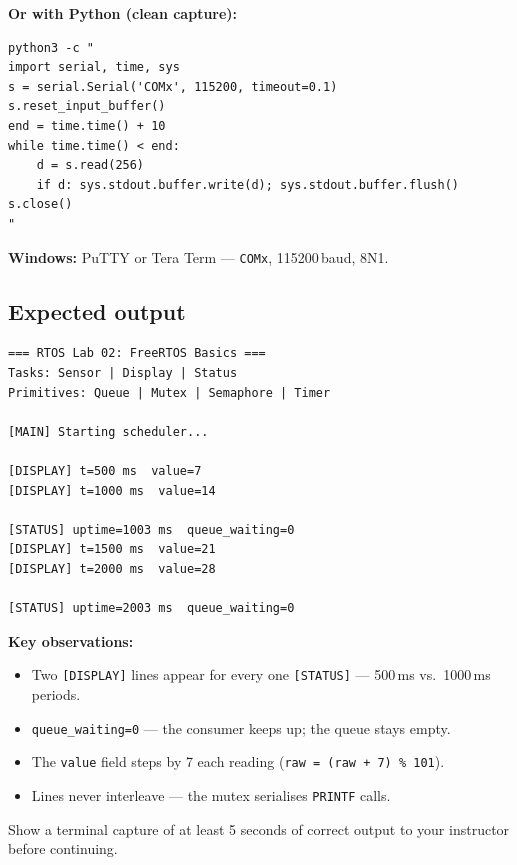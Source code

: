 \documentclass[11pt, a4paper]{article}
\newcommand{\api}[1]{\texttt{\small #1}}
\begin{document}
\textbf{Or with Python (clean capture):}

\begin{lstlisting}[style=bashstyle]
python3 -c "
import serial, time, sys
s = serial.Serial('COMx', 115200, timeout=0.1)
s.reset_input_buffer()
end = time.time() + 10
while time.time() < end:
    d = s.read(256)
    if d: sys.stdout.buffer.write(d); sys.stdout.buffer.flush()
s.close()
"
\end{lstlisting}

\textbf{Windows:} PuTTY or Tera Term --- \texttt{COMx}, 115200\,baud, 8N1.

\subsection{Expected output}

\begin{lstlisting}[style=textstyle]
=== RTOS Lab 02: FreeRTOS Basics ===
Tasks: Sensor | Display | Status
Primitives: Queue | Mutex | Semaphore | Timer

[MAIN] Starting scheduler...

[DISPLAY] t=500 ms  value=7
[DISPLAY] t=1000 ms  value=14

[STATUS] uptime=1003 ms  queue_waiting=0
[DISPLAY] t=1500 ms  value=21
[DISPLAY] t=2000 ms  value=28

[STATUS] uptime=2003 ms  queue_waiting=0
\end{lstlisting}

\begin{tipbox}
  \textbf{Key observations:}
  \begin{itemize}[noitemsep]
    \item Two \texttt{[DISPLAY]} lines appear for every one \texttt{[STATUS]} ---
          500\,ms vs.\ 1000\,ms periods.
    \item \texttt{queue\_waiting=0} --- the consumer keeps up; the queue stays empty.
    \item The \texttt{value} field steps by 7 each reading
          (\texttt{raw = (raw + 7) \% 101}).
    \item Lines never interleave --- the mutex serialises \api{PRINTF} calls.
  \end{itemize}
\end{tipbox}

\begin{checkpointbox}[~A]
  Show a terminal capture of at least 5 seconds of correct output to your instructor
  before continuing.
\end{checkpointbox}
\end{document}
